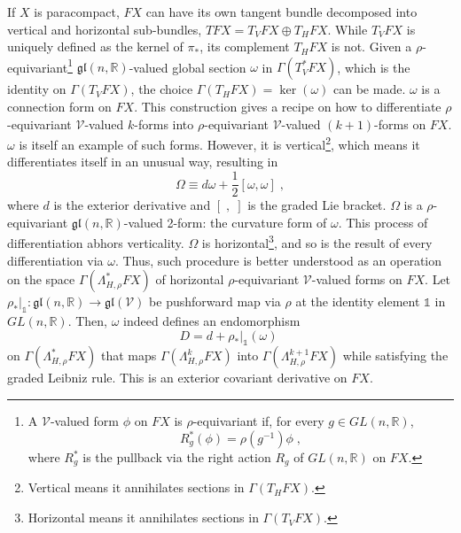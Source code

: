 \documentclass[../../main.tex]{subfiles}
\begin{document}
If $X$ is paracompact, $FX$ can have its own tangent bundle decomposed into vertical and horizontal sub-bundles, $ TFX = T_V FX \oplus T_H FX $. While $T_V FX$ is uniquely defined as the kernel of $\pi_*$, its complement $T_H FX$ is not. Given a $\rho$-equivariant\footnote{A $\mathcal{V}$-valued form $\phi$ on $FX$ is $\rho$-equivariant if, for every $ g \in GL \left( n, \mathbb{R} \right) $, \[ {R}^{*}_{g} \left( \phi \right) = \rho \left( {g}^{-1} \right) \phi \;, \] where $ {R}^{*}_{g} $ is the pullback via the right action $ {R}_{g} $ of $ GL \left( n,\mathbb{R} \right) $ on $ FX $.} $ \mathfrak{gl} \left( n, \mathbb{R} \right) $-valued global section $\omega$ in $\Gamma\left({T}_{V}^{*} FX\right)$, which is the identity on $ \Gamma \left ( T_V FX \right) $, the choice $ \Gamma \left( T_H FX \right) = \ker \left( \omega \right)$ can be made. $\omega$ is a connection form on $FX$. This construction gives a recipe on how to differentiate $\rho$-equivariant $\mathcal{V}$-valued $k$-forms into $\rho$-equivariant $\mathcal{V}$-valued $\left(k+1\right)$-forms on $FX$. $\omega$ is itself an example of such forms. However, it is vertical\footnote{Vertical means it annihilates sections in $ \Gamma \left( T_H FX \right) $.}, which means it differentiates itself in an unusual way, resulting in
\begin{equation}\label{eq:curvatureform}
  \Omega\equiv d\omega+\frac{1}{2}\left[\omega,\omega\right] \;,
\end{equation}
where $d$ is the exterior derivative and $\left[\;,\;\right]$ is the graded Lie bracket. $\Omega$ is a $\rho$-equivariant $\mathfrak{gl}\left(n,\mathbb{R}\right)$-valued 2-form: the curvature form of $\omega$. This process of differentiation abhors verticality. $\Omega$ is horizontal\footnote{Horizontal means it annihilates sections in $ \Gamma \left( T_V FX \right) $.}, and so is the result of every differentiation via $\omega$. Thus, such procedure is better understood as an operation on the space $\Gamma\left(\Lambda_{H,\rho}^*FX\right)$ of horizontal $\rho$-equivariant $\mathcal{V}$-valued forms on $FX$. Let $\rho_*|_{\mathds{1}}: \mathfrak{gl}\left(n,\mathbb{R}\right) \rightarrow \mathfrak{gl}\left(\mathcal{V}\right)$ be pushforward map via $\rho$ at the identity element $\mathds{1}$ in $GL\left(n,\mathbb{R}\right)$. Then, $\omega$ indeed defines an endomorphism
\begin{equation}
  \label{eq:ext.cov.der.}
  D=d+\rho_*|_{\mathds{1}}\left(\omega\right) \;
\end{equation}
on $\Gamma\left(\Lambda^*_{H,\rho} FX\right)$ that maps $\Gamma\left(\Lambda^k_{H,\rho} FX\right)$ into $\Gamma(\Lambda^{k+1}_{H,\rho} FX)$ while satisfying the graded Leibniz rule. This is an exterior covariant derivative on $FX$.
\end{document}
